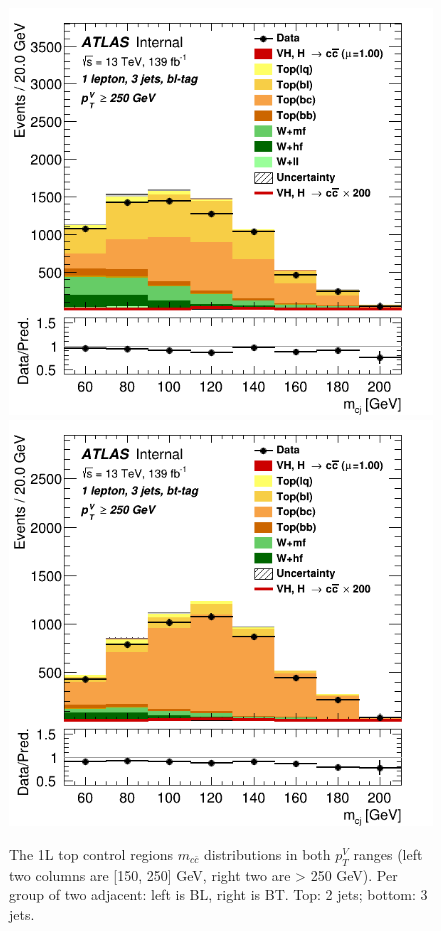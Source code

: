 \begin{figure}[h!]
\includegraphics[scale=0.2]{Images/VH/SRsandTopCRs/Region_distmBB_DtopCRBL_L1_Y6051_TTypebl_T1_J3_BMin250_Prefit.png}
\includegraphics[scale=0.2]{Images/VH/SRsandTopCRs/Region_distmBB_DtopCRBC_L1_Y6051_TTypebt_T1_J3_BMin250_Prefit.png}
\caption{The 1L top control regions $m_{c\bar{c}}$ distributions in both $p_T^V$ ranges (left two columns are [150, 250] GeV, right two are > 250 GeV). Per group of two adjacent: left is BL, right is BT. Top: 2 jets; bottom: 3 jets.} 
\label{fig:topCRslowptv}
\end{figure}

